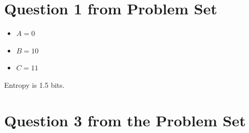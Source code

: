 \documentclass{article}
\begin{document}
    \section{Question 1 from Problem Set}
    \begin{itemize}
        \item $A = 0$
        \item $B = 10$
        \item $C = 11$
    \end{itemize}
    Entropy is 1.5 bits.

    \section{Question 3 from the Problem Set}
\end{document}
